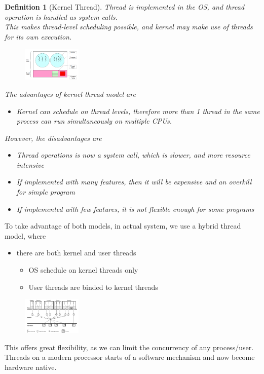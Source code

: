 \documentclass[11pt]{article}
\newtheorem{definition}{Definition}[section]
\theoremstyle{definition}
\begin{document}
\begin{definition}[Kernel Thread]
\normalfont Thread is implemented in the OS, and thread operation is handled as system calls.\\
This makes thread-level scheduling possible, and kernel may make use of threads for its own execution.
\begin{figure}[h]
\centering
\includegraphics[width=0.25\textwidth]{4_2.png}
\end{figure}
The advantages of kernel thread model are
\begin{itemize}[itemsep=0pt]
  \item Kernel can schedule on thread levels, therefore more than 1 thread in the same process can run simultaneously on multiple CPUs.
\end{itemize}
However, the disadvantages are
\begin{itemize}[itemsep=0pt]
  \item Thread operations is now a system call, which is slower, and more resource intensive
  \item If implemented with many features, then it will be expensive and an overkill for simple program
  \item If implemented with few features, it is not flexible enough for some programs
\end{itemize}
\end{definition}
To take advantage of both models, in actual system, we use a hybrid thread model, where
\begin{itemize}[itemsep=0pt]
  \item there are both kernel and user threads
  \begin{itemize}[itemsep=0pt]
    \item OS schedule on kernel threads only
    \item User threads are binded to kernel threads
  \end{itemize}
\end{itemize}
\begin{figure}[h]
\centering
\includegraphics[width=0.25\textwidth]{4_3.png}
\end{figure}
This offers great flexibility, as we can limit the concurrency of any process/user.\\
Threads on a modern processor starts of a software mechanism and now become hardware native.
\end{document}
